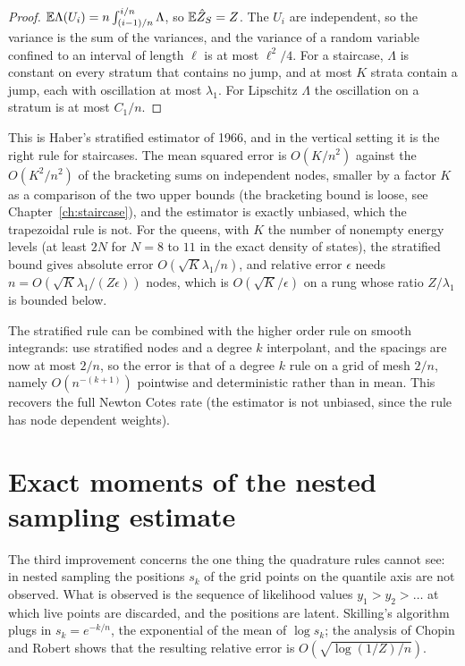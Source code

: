 \begin{proof}
$\mathbb{E} \Lambda(U_i) = n \int_{(i-1)/n}^{i/n} \Lambda$, so $\mathbb{E} \hat Z_S = Z$. The $U_i$ are independent, so the variance is the sum of the variances, and the variance of a random variable confined to an interval of length $\ell$ is at most $\ell^2 / 4$. For a staircase, $\Lambda$ is constant on every stratum that contains no jump, and at most $K$ strata contain a jump, each with oscillation at most $\lambda_1$. For Lipschitz $\Lambda$ the oscillation on a stratum is at most $C_1 / n$.
\end{proof}

This is Haber's \cite{Haber} stratified estimator of 1966, and in the vertical setting it is the right rule for staircases. The mean squared error is $O(K / n^2)$ against the $O(K^2 / n^2)$ of the bracketing sums on independent nodes, smaller by a factor $K$ as a comparison of the two upper bounds (the bracketing bound is loose, see Chapter~\ref{ch:staircase}), and the estimator is exactly unbiased, which the trapezoidal rule is not. For the queens, with $K$ the number of nonempty energy levels (at least $2N$ for $N = 8$ to $11$ in the exact density of states), the stratified bound gives absolute error $O(\sqrt K \lambda_1 / n)$, and relative error $\epsilon$ needs $n = O(\sqrt K \lambda_1 / (Z \epsilon))$ nodes, which is $O(\sqrt K / \epsilon)$ on a rung whose ratio $Z / \lambda_1$ is bounded below.

The stratified rule can be combined with the higher order rule on smooth integrands: use stratified nodes and a degree $k$ interpolant, and the spacings are now at most $2/n$, so the error is that of a degree $k$ rule on a grid of mesh $2/n$, namely $O(n^{-(k+1)})$ pointwise and deterministic rather than in mean. This recovers the full Newton Cotes rate (the estimator is not unbiased, since the rule has node dependent weights).

\section{Exact moments of the nested sampling estimate}

The third improvement concerns the one thing the quadrature rules cannot see: in nested sampling the positions $s_k$ of the grid points on the quantile axis are not observed. What is observed is the sequence of likelihood values $y_1 > y_2 > \dots$ at which live points are discarded, and the positions are latent. Skilling's \cite{Skilling} algorithm plugs in $s_k = e^{-k/n}$, the exponential of the mean of $\log s_k$; the analysis of Chopin and Robert \cite{ChopinRobert} shows that the resulting relative error is $O(\sqrt{\log(1/Z) / n})$.

